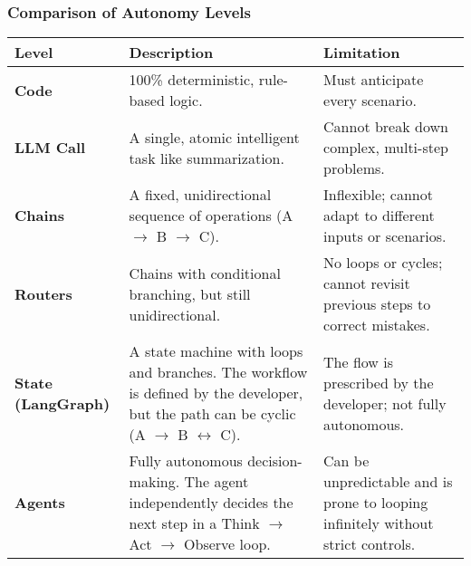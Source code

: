 \begin{frame}[fragile]\frametitle{Comparison of Autonomy Levels}
\begin{tabular}{|l|p{4cm}|p{5cm}|}
\hline
\textbf{Level} & \textbf{Description} & \textbf{Limitation} \\
\hline
\textbf{Code} & 100\% deterministic, rule-based logic. & Must anticipate every scenario. \\
\hline
\textbf{LLM Call} & A single, atomic intelligent task like summarization. & Cannot break down complex, multi-step problems. \\
\hline
\textbf{Chains} & A fixed, unidirectional sequence of operations (A \(\rightarrow\) B \(\rightarrow\) C). & Inflexible; cannot adapt to different inputs or scenarios. \\
\hline
\textbf{Routers} & Chains with conditional branching, but still unidirectional. & No loops or cycles; cannot revisit previous steps to correct mistakes. \\
\hline
\textbf{State (LangGraph)} & A state machine with loops and branches. The workflow is defined by the developer, but the path can be cyclic (A \(\rightarrow\) B \(\leftrightarrow\) C). & The flow is prescribed by the developer; not fully autonomous. \\
\hline
\textbf{Agents} & Fully autonomous decision-making. The agent independently decides the next step in a Think \(\rightarrow\) Act \(\rightarrow\) Observe loop. & Can be unpredictable and is prone to looping infinitely without strict controls. \\
\hline
\end{tabular}
\end{frame}

